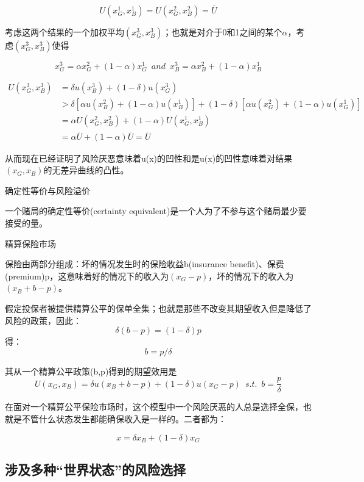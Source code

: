 \documentclass{article}
\begin{document}
\[
U(x_G^1,x_B^1)=U(x_G^2,x_B^2)=\overline{U}
\]

考虑这两个结果的一个加权平均$ (x_G^3,x_B^3) $；也就是对介于0和1之间的某个$ \alpha $，考虑$ (x_G^3,x_B^3) $使得

\[
x_G^3=\alpha x_G^2+(1-\alpha)x_G^1\enspace and\enspace x_B^3=\alpha x_B^2+(1-\alpha)x_B^1
\]

\begin{equation*}
	\begin{split}
	U(x_G^3,x_B^3)&=\delta u(x_B^3)+(1-\delta)u(x_G^3)\\
	&>\delta[\alpha u(x_B^2)+(1-\alpha)u(x_B^1)]+(1-\delta)[\alpha u(x_G^2)+(1-\alpha)u(x_G^1)]\\
	&=\alpha U(x_G^2,x_B^2)+(1-\alpha)U(x_G^1,x_B^1)\\
	&=\alpha\overline{U}+(1-\alpha)\overline{U}=\overline{U}
	\end{split}	
\end{equation*}

从而现在已经证明了风险厌恶意味着u(x)的凹性和是u(x)的凹性意味着对结果$ (x_G,x_B) $的无差异曲线的凸性。

\hspace*{\fill}

确定性等价与风险溢价 

一个赌局的确定性等价(certainty equivalent)是一个人为了不参与这个赌局最少要接受的量。

\hspace*{\fill}

精算保险市场

保险由两部分组成：坏的情况发生时的保险收益b(insurance benefit)、保费(premium)p，这意味着好的情况下的收入为$ (x_G-p) $，坏的情况下的收入为$ (x_B+b-p) $。

假定投保者被提供精算公平的保单全集；也就是那些不改变其期望收入但是降低了风险的政策，因此：
\[
\delta(b-p)=(1-\delta)p
\]
得：
\[
b=p/\delta
\]

其从一个精算公平政策(b,p)得到的期望效用是
\[
U(x_G,x_B)=\delta u(x_B+b-p)+(1-\delta)u(x_G-p)\enspace s.t.\enspace b=\frac{p}{\delta}
\]

在面对一个精算公平保险市场时，这个模型中一个风险厌恶的人总是选择全保，也就是不管什么状态发生都能确保收入是一样的。二者都为：

\[
x=\delta x_B+(1-\delta)x_G
\]

\subsection{涉及多种“世界状态”的风险选择}
\end{document}

